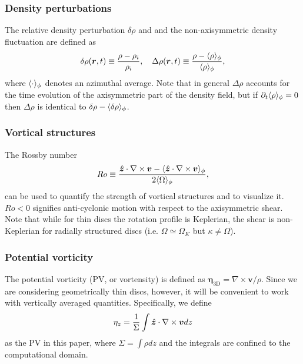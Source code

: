 \subsubsection{Density perturbations}
The relative density perturbation $\delta\rho$ and 
and the non-axisymmetric density fluctuation are defined as 
\begin{align}
  \delta\rho(\bm{r},t) \equiv \frac{\rho - \rho_i}{\rho_i}, \quad
  \Delta\rho(\bm{r},t) \equiv \frac{\rho -
    \langle \rho \rangle_\phi}{\langle \rho \rangle_\phi}, 
\end{align} 
where $\langle \cdot \rangle_\phi$ denotes an azimuthal average.  
Note that in general $\Delta\rho$ accounts for the time evolution of
the axisymmetric part of the density field, but if
$\partial_t\langle \rho \rangle_\phi=0$ then $\Delta\rho$ is identical to
$\delta\rho-\langle \delta\rho \rangle_\phi$.   

\subsubsection{Vortical structures}
The Rossby number
\begin{align}
  Ro \equiv
  \frac{\hat{\bm{z}}\cdot\nabla\times\bm{v}-\langle \hat{\bm{z}}\cdot\nabla\times\bm{v} \rangle_\phi}{2\langle \Omega \rangle_\phi},   
\end{align} 
can be used to quantify the strength of vortical structures and to
visualize it. $Ro<0$ signifies anti-cyclonic motion with respect to
the axisymmetric shear. Note that while for thin discs the rotation
profile is Keplerian, the shear is non-Keplerian for radially  
structured discs (i.e. $\Omega\simeq\Omega_K$ but
$\kappa\neq\Omega$). 

\subsubsection{Potential vorticity}
The potential vorticity (PV, or vortensity) is defined as
$  \bm{\eta}_\mathrm{3D} = \nabla\times\bm{v}/\rho. $
Since we are considering geometrically thin discs, however, it will be
convenient to work with vertically averaged quantities. Specifically,
we define 
\begin{align}
  \eta_z = \frac{1}{\Sigma}\int \hat{\bm{z}}\cdot\nabla\times\bm{v} dz
\end{align}
as the PV in this paper, where $\Sigma = \int\rho dz$ and the
integrals are confined to the computational domain. 

